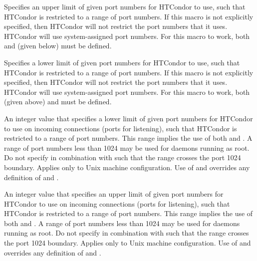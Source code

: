 \begin{description}
\label{param:HighPort}
\item[\Macro{HIGHPORT}]
  Specifies an upper limit of given port numbers for HTCondor to use,
  such that HTCondor is restricted to a range of port numbers.
  If this macro is not explicitly specified, then HTCondor will
  not restrict the port numbers that it uses. HTCondor will use
  system-assigned port numbers.
  For this macro to work, both  and
   (given below) must be defined.

\label{param:LowPort}
\item[\Macro{LOWPORT}]
  Specifies a lower limit of given port numbers for HTCondor to use,
  such that HTCondor is restricted to a range of port numbers.
  If this macro is not explicitly specified, then HTCondor will
  not restrict the port numbers that it uses. HTCondor will use
  system-assigned port numbers.
  For this macro to work, both  (given above) and
   must be defined.

\label{param:InLowPort}
\item[\Macro{IN\_LOWPORT}]
  An integer value that specifies a lower limit of given port numbers
  for HTCondor to use on incoming connections (ports for listening),
  such that HTCondor is restricted to a range of port numbers.
  This range implies the use of both  and
  .
  A range of port numbers less than 1024 may be used for daemons 
  running as root.
  Do not specify  in combination with 
   such that the range crosses the port 1024
  boundary.
  Applies only to Unix machine configuration.
  Use of  and  overrides
  any definition of  and .

\label{param:InHighPort}
\item[\Macro{IN\_HIGHPORT}]
  An integer value that specifies an upper limit of given port numbers
  for HTCondor to use on incoming connections (ports for listening),
  such that HTCondor is restricted to a range of port numbers.
  This range implies the use of both  and
  .
  A range of port numbers less than 1024 may be used for daemons 
  running as root.
  Do not specify  in combination with 
   such that the range crosses the port 1024
  boundary.
  Applies only to Unix machine configuration.
  Use of  and  overrides
  any definition of  and .


\end{description}
